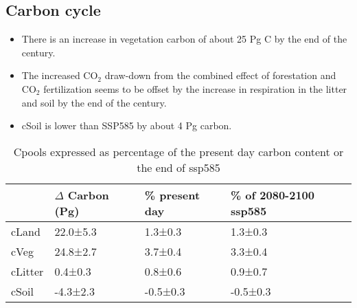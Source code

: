 \documentclass[]{article}
\begin{document}
\subsection{Carbon cycle}

\begin{itemize}
    \item There is an increase in vegetation carbon of about 25 Pg C by the end of the century.
    \item The increased CO$_2$ draw-down from the combined effect of forestation and CO$_2$ fertilization seems to be offset by the increase in respiration in the litter and soil by the end of the century.
    \item cSoil is lower than SSP585 by about 4 Pg carbon.
\end{itemize}

\begin{table}[H]
    \centering
    \begin{tabular}{@{}llll@{}}
    \hline
        & $\Delta$ Carbon (Pg) & \% present day & \% of 2080-2100 ssp585 \\ \hline
cLand   & 22.0±5.3    & 1.3±0.3        & 1.3±0.3                \\
cVeg    & 24.8±2.7    & 3.7±0.4        & 3.3±0.4                \\
cLitter & 0.4±0.3     & 0.8±0.6        & 0.9±0.7                \\
cSoil   & -4.3±2.3    & -0.5±0.3       & -0.5±0.3               \\ \hline
    \end{tabular}
    \caption{Cpools expressed as percentage of the present day carbon content or the end of ssp585}
    \label{tab:cpools_table}
\end{table}
\end{document}
